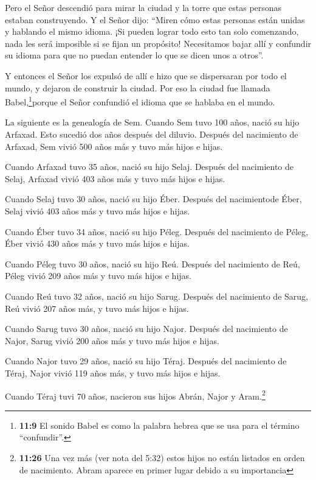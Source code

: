  Pero el Señor descendió para mirar la ciudad y la torre que
estas personas estaban construyendo.  Y el Señor dijo:
``Miren cómo estas personas están unidas y hablando el mismo idioma. ¡Si
pueden lograr todo esto tan solo comenzando, nada les será imposible si
se fijan un propósito!  Necesitamos bajar allí y confundir
su idioma para que no puedan entender lo que se dicen unos a otros''.

 Y entonces el Señor los expulsó de allí e hizo que se
dispersaran por todo el mundo, y dejaron de construir la ciudad.
 Por eso la ciudad fue llamada Babel,\footnote{\textbf{11:9}
  El sonido Babel es como la palabra hebrea que se usa para el término
  ``confundir''.}porque el Señor confundió el idioma que se hablaba en
el mundo.

 La siguiente es la genealogía de Sem. Cuando Sem tuvo 100
años, nació su hijo Arfaxad. Esto sucedió dos años después del diluvio.
 Después del nacimiento de Arfaxad, Sem vivió 500 años más
y tuvo más hijos e hijas.

 Cuando Arfaxad tuvo 35 años, nació su hijo Selaj.
 Después del nacimiento de Selaj, Arfaxad vivió 403 años
más y tuvo más hijos e hijas.

 Cuando Selaj tuvo 30 años, nació su hijo Éber.
 Después del nacimientode Éber, Selaj vivió 403 años más y
tuvo más hijos e hijas.

 Cuando Éber tuvo 34 años, nació su hijo Péleg.
 Después del nacimiento de Péleg, Éber vivió 430 años más y
tuvo más hijos e hijas.

 Cuando Péleg tuvo 30 años, nació su hijo Reú.
 Después del nacimiento de Reú, Péleg vivió 209 años más y
tuvo más hijos e hijas.

 Cuando Reú tuvo 32 años, nació su hijo Sarug.
 Después del nacimiento de Sarug, Reú vivió 207 años más, y
tuvo más hijos e hijas.

 Cuando Sarug tuvo 30 años, nació su hijo Najor.
 Después del nacimiento de Najor, Sarug vivió 200 años más
y tuvo más hijos e hijas.

 Cuando Najor tuvo 29 años, nació su hijo Téraj.
 Después del nacimiento de Téraj, Najor vivió 119 años más,
y tuvo más hijos e hijas.

 Cuando Téraj tuvi 70 años, nacieron sus hijos Abrán, Najor
y Aram.\footnote{\textbf{11:26} Una vez más (ver nota del 5:32) estos
  hijos no están listados en orden de nacimiento. Abram aparece en
  primer lugar debido a su importancia}

